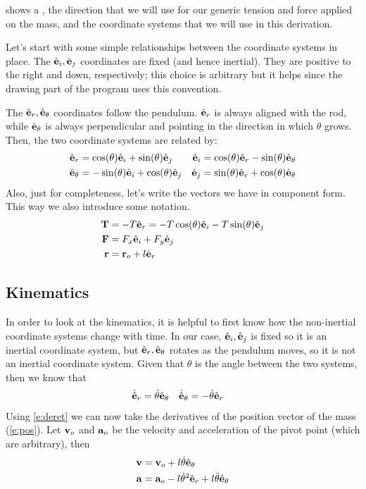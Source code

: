 \documentclass{article}
\begin{document}
 shows a \ntsp, the direction that we will use for our generic tension and force applied on the mass, and the coordinate systems that we will use in this derivation.

Let's start with some simple relationships between the coordinate systems in place. The ${\hat{\mathbf{e}}_i,\hat{\mathbf{e}}_j}$ coordinates are fixed (and hence inertial). They are positive to the right and down, respectively; this choice is arbitrary but it helps since the drawing part of the program uses this convention.

The ${\hat{\mathbf{e}}_r,\hat{\mathbf{e}}_\theta}$ coordinates follow the pendulum. $\hat{\mathbf{e}}_r$ is always aligned with the rod, while $\hat{\mathbf{e}}_\theta$ is always perpendicular and pointing in the direction in which $\theta$ grows. Then, the two coordinate systems are related by:
\begin{equation}
\begin{aligned}
  \hat{\mathbf{e}}_r &= \cos(\theta)\hat{\mathbf{e}}_i+\sin(\theta)\hat{\mathbf{e}}_j & \hat{\mathbf{e}}_i &= \cos(\theta)\hat{\mathbf{e}}_r - \sin(\theta)\hat{\mathbf{e}}_\theta \\
  \hat{\mathbf{e}}_\theta &=-\sin(\theta)\hat{\mathbf{e}}_i+\cos(\theta)\hat{\mathbf{e}}_j & \hat{\mathbf{e}}_j &= \sin(\theta)\hat{\mathbf{e}}_r + \cos(\theta)\hat{\mathbf{e}}_\theta
\end{aligned}
\label{e:cs}
\end{equation}
Also, just for completeness, let's write the vectors we have in component form. This way we also introduce some notation.
\begin{align}
  \mathbf{T}&=-T\hat{\mathbf{e}}_r = -T\cos(\theta)\hat{\mathbf{e}}_i-T\sin(\theta)\hat{\mathbf{e}}_j\\
  \mathbf{F}&=F_x\hat{\mathbf{e}}_i+F_y\hat{\mathbf{e}}_j\\
  \mathbf{r}&=\mathbf{r}_{o}+l\hat{\mathbf{e}}_r \label{e:pos}
\end{align}

\subsection{Kinematics}
In order to look at the kinematics, it is helpful to first know how the non-inertial coordinate systems change with time. In our case, ${\hat{\mathbf{e}}_i,\hat{\mathbf{e}}_j}$ is fixed so it is an inertial coordinate system, but ${\hat{\mathbf{e}}_r,\hat{\mathbf{e}}_\theta}$ rotates as the pendulum moves, so it is not an inertial coordinate system. Given that $\theta$ is the angle between the two systems, then we know that
\begin{align}
  \dot{\hat{\mathbf{e}}}_r&=\dot{\theta}\hat{\mathbf{e}}_\theta & \dot{\hat{\mathbf{e}}}_\theta&=-\dot{\theta}\hat{\mathbf{e}}_r
  \label{e:deret}
\end{align}
Using \cref{e:deret} we can now take the derivatives of the position vector of the mass (\cref{e:pos}). Let $\mathbf{v}_{o}$ and $\mathbf{a}_{o}$ be the velocity and acceleration of the pivot point (which are arbitrary), then
\begin{align}
  \mathbf{v}&=\mathbf{v}_{o}+l\dot\theta\hat{\mathbf{e}}_\theta \notag\\
  \mathbf{a}&=\mathbf{a}_{o}-l{\dot\theta}^2\hat{\mathbf{e}}_r+l\ddot\theta\hat{\mathbf{e}}_\theta
\end{align}
\end{document}

